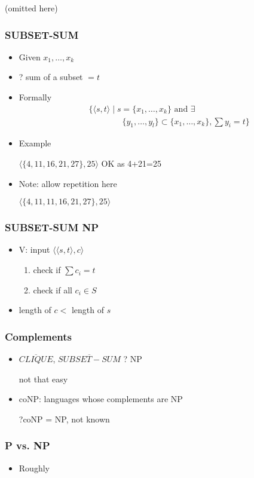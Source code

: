 \begin{frame}[allowframebreaks]
\begin{itemize}
(omitted here)



\end{itemize}\end{frame} \begin{frame}[allowframebreaks] \frametitle{SUBSET-SUM}
  \begin{itemize}
\item Given $x_1, \ldots, x_k$
\item ? sum of a subset $=t$
\item Formally
  \begin{eqnarray*}
&&    \{\langle  s,t\rangle 
\mid s=\{x_1, \ldots, x_k\}
\mbox{ and }
\exists \\
&&\qquad \qquad \{y_1, \ldots, y_l\}
\subset \{x_1, \ldots, x_k\},
\sum y_i =t\}
\end{eqnarray*}

\item Example

$\langle  \{4,11,16,21,27\},25\rangle $ OK
as 4+21=25
\item Note: allow repetition here

$\langle  \{4,11,11,16,21,27\},25\rangle $ 
 \end{itemize}\end{frame} \begin{frame}[allowframebreaks] \frametitle{SUBSET-SUM NP}
  \begin{itemize}
 \item V: input $\langle  \langle  s,t\rangle ,c\rangle $
  \begin{enumerate}
  \item check if $\sum c_i=t$
  \item check if all $c_i \in S$
  \end{enumerate}
\item length of $c <$  length of $s$
\end{itemize}\end{frame} \begin{frame}[allowframebreaks] \frametitle{Complements}
  \begin{itemize}
\item $\overline{CLIQUE}$,
$\overline{SUBSET-SUM}$ ? NP

not that easy

\item coNP: languages whose complements are NP

?coNP = NP, not known
\end{itemize}\end{frame} \begin{frame}[allowframebreaks] \frametitle{P vs. NP}
  \begin{itemize}
\item Roughly


\end{itemize}
\end{frame}

